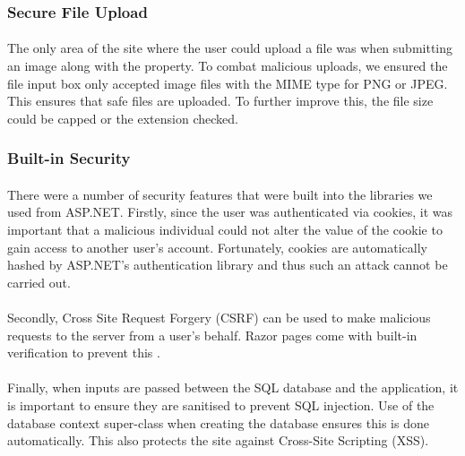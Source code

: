 \documentclass{article}
\begin{document}
        \subsubsection{Secure File Upload}
            \paragraph{}
                The only area of the site where the user could upload a file was when submitting an image along with the property.
                To combat malicious uploads, we ensured the file input box only accepted image files with the MIME type for PNG or JPEG.
                This ensures that safe files are uploaded.
                To further improve this, the file size could be capped or the extension checked.

        \subsubsection{Built-in Security}
            \paragraph{}
                There were a number of security features that were built into the libraries we used from ASP.NET.
                Firstly, since the user was authenticated via cookies, it was important that a malicious individual could not alter the value of the cookie to gain access to another user’s account.
                Fortunately, cookies are automatically hashed by ASP.NET’s authentication library and thus such an attack cannot be carried out.

            \paragraph{}
                Secondly, Cross Site Request Forgery (CSRF) can be used to make malicious requests to the server from a user’s behalf.
                Razor pages come with built-in verification to prevent this \cite{request_verification}.

            \paragraph{}
                Finally, when inputs are passed between the SQL database and the application, it is important to ensure they are sanitised to prevent SQL injection.
                Use of the database context super-class when creating the database ensures this is done automatically.
                This also protects the site against Cross-Site Scripting (XSS).
\end{document}
